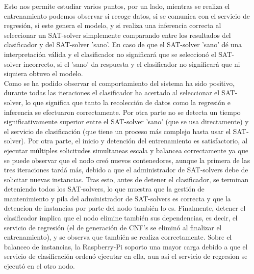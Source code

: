 \documentclass[11pt]{article}
\begin{document}
		Esto nos permite estudiar varios puntos, por un lado, mientras se realiza el entrenamiento podemos observar si recoge datos, si se comunica con el servicio de regresión, si este genera el modelo,
		y si realiza una inferencia correcta al seleccionar un SAT-solver simplemente comparando entre los resultados del clasificador y del SAT-solver 'sano'. En caso de que el SAT-solver 'sano' dé una
		interpretación válida y el clasificador no significará que se seleccionó el SAT-solver incorrecto, si el 'sano' da respuesta y el clasificador no significará que ni siquiera obtuvo el modelo. \\

		Como se ha podido observar el comportamiento del sistema ha sido positivo, durante todas las iteraciones el clasificador ha acertado al seleccionar el SAT-solver, lo que significa que tanto la recolección
		de datos como la regresión e inferencia se efectuaron correctamente. Por otra parte no se detecta un tiempo significativamente superior entre el SAT-solver 'sano' (que se usa directamente) y el servicio
		de clasificación (que tiene un proceso más complejo hasta usar el SAT-solver). Por otra parte, el inicio y detención del entrenamiento es satisfactorio, al ejecutar múltiples solicitudes simultaneas 
		escala y balancea correctamente ya que se puede observar que el nodo creó nuevos contenedores, aunque la primera de las tres iteraciones tardá más, debido a que el administrador de SAT-solvers debe de 
		solicitar nuevas instancias. Tras esto, antes de detener el clasificador, se terminan deteniendo todos los SAT-solvers, lo que muestra que la gestión de mantenimiento y pila del administrador de SAT-solvers
		es correcta y que la detencion de instancias por parte del nodo también lo es. Finalmente, detener el clasificador implica que el nodo elimine también sus dependencias, es decir, el servicio de regresión
		(el de generación de CNF's se eliminó al finalizar el entrenamiento), y se observa que también se realiza correctamente. 
		Sobre el balanceo de instancias, la Raspberry-Pi soporto una mayor carga debido a que el servicio de clasificación ordenó ejecutar en ella, aun así el servicio de regresion se ejecutó en el otro nodo. \\
		
\end{document}
